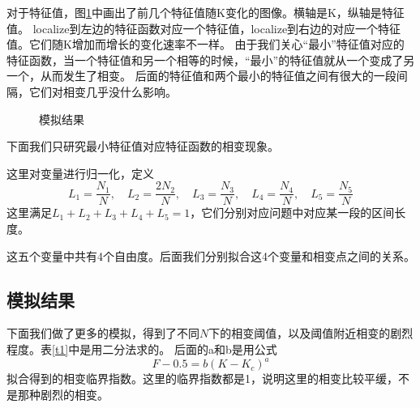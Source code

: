 \documentclass[12pt,a4paper]{article}
\begin{document}
对于特征值，图\ref{f5}中画出了前几个特征值随K变化的图像。横轴是K，纵轴是特征值。
localize到左边的特征函数对应一个特征值，localize到右边的对应一个特征值。它们随K增加而增长的变化速率不一样。
由于我们关心“最小”特征值对应的特征函数，当一个特征值和另一个相等的时候，“最小”的特征值就从一个变成了另一个，从而发生了相变。
后面的特征值和两个最小的特征值之间有很大的一段间隔，它们对相变几乎没什么影响。
\begin{figure}[h]
\centering
{}
\caption{模拟结果}
\label{f5}
\end{figure}

下面我们只研究最小特征值对应特征函数的相变现象。

这里对变量进行归一化，定义
$$ L_1 = \frac{N_1}{N}, \quad L_2 = \frac{2 N_2}{N}, \quad L_3 = \frac{N_3}{N}, \quad L_4 = \frac{N_4}{N}, \quad L_5 = \frac{N_5}{N} $$
这里满足$L_1+L_2+L_3+L_4+L_5 = 1$，它们分别对应问题中对应某一段的区间长度。

这五个变量中共有4个自由度。后面我们分别拟合这4个变量和相变点之间的关系。

\subsection{模拟结果}

下面我们做了更多的模拟，得到了不同$N$下的相变阈值，以及阈值附近相变的剧烈程度。表\ref{t1}中是用二分法求的。
后面的a和b是用公式
$$ F - 0.5 = b(K - K_c)^a $$
拟合得到的相变临界指数。这里的临界指数都是1，说明这里的相变比较平缓，不是那种剧烈的相变。
\end{document}
